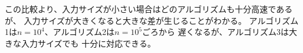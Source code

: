 \begin{comment}
The comparison shows that all algorithms
are efficient when the input size is small,
but larger inputs bring out remarkable
differences in the running times of the algorithms.
Algorithm 1 becomes slow
when $n=10^4$, and Algorithm 2
becomes slow when $n=10^5$.
Only Algorithm 3 is able to process
even the largest inputs instantly.
\end{comment}

この比較より、入力サイズが小さい場合はどのアルゴリズムも十分高速であるが、
入力サイズが大きくなると大きな差が生じることがわかる。
アルゴリズム1は$n=10^4$、アルゴリズム2は$n=10^5$ごろから
遅くなるが、アルゴリズム3は大きな入力サイズでも
十分に対応できる。
